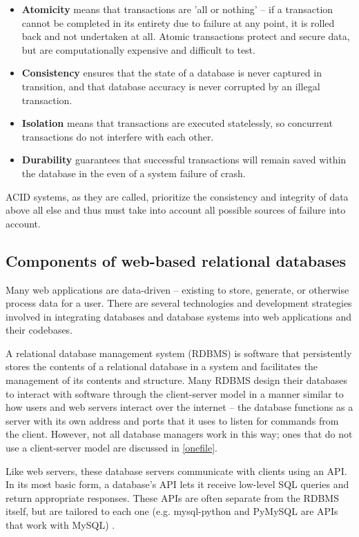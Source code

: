 \begin{itemize}
	\item \textbf{Atomicity} means that transactions are 'all or nothing' -- if a transaction cannot be completed in its entirety due to failure at any point, it is rolled back and not undertaken at all. Atomic transactions protect and secure data, but are computationally expensive and difficult to test.
	\item \textbf{Consistency} ensures that the state of a database is never captured in transition, and that database accuracy is never corrupted by an illegal transaction. 
	\item \textbf{Isolation} means that transactions are executed statelessly, so concurrent transactions do not interfere with each other.
	\item \textbf{Durability} guarantees that successful transactions will remain saved within the database in the even of a system failure of crash.
\end{itemize}

ACID systems, as they are called, prioritize the consistency and integrity of data above all else and thus must take into account all possible sources of failure into account.

\subsection{Components of web-based relational databases}

Many web applications are data-driven -- existing to store, generate, or otherwise process data for a user. There are several technologies and development strategies involved in integrating databases and database systems into web applications and their codebases.

A relational database management system (RDBMS) is software that persistently stores the contents of a relational database in a system and facilitates the management of its contents and structure. Many RDBMS design their databases to interact with software through the client-server model in a manner similar to how users and web servers interact over the internet -- the database functions as a server with its own address and ports that it uses to listen for commands from the client. However, not all database managers work in this way; ones that do not use a client-server model are discussed in \autoref{onefile}.

Like web servers, these database servers communicate with clients using an API. In its most basic form, a database's API lets it receive low-level SQL queries and return appropriate responses. These APIs are often separate from the RDBMS itself, but are tailored to each one (e.g. mysql-python and PyMySQL are APIs that work with MySQL) \cite{adedeji_full-stack_2023}. 

